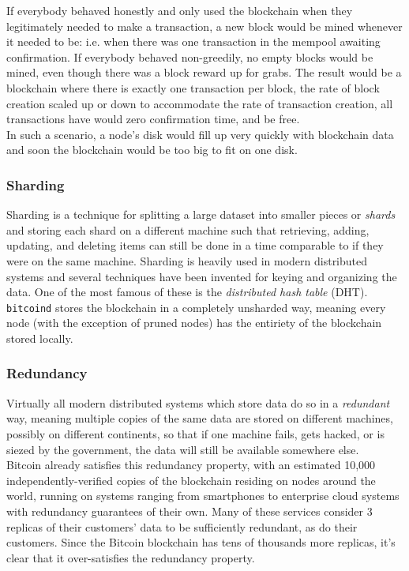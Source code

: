 \documentclass{report}
\begin{document}
				If everybody behaved honestly and only used the blockchain when they legitimately needed to make a transaction, a new block would be mined whenever it needed to be: i.e. when there was one transaction in the mempool awaiting confirmation. If everybody behaved non-greedily, no empty blocks would be mined, even though there was a block reward up for grabs. The result would be a blockchain where there is exactly one transaction per block, the rate of block creation scaled up or down to accommodate the rate of transaction creation, all transactions have would zero confirmation time, and be free. \\

				In such a scenario, a node's disk would fill up very quickly with blockchain data and soon the blockchain would be too big to fit on one disk.
			\subsubsection{Sharding}
				Sharding is a technique for splitting a large dataset into smaller pieces or \textit{shards} and storing each shard on a different machine such that retrieving, adding, updating, and deleting items can still be done in a time comparable to if they were on the same machine. Sharding is heavily used in modern distributed systems and several techniques have been invented for keying and organizing the data. One of the most famous of these is the \textit{distributed hash table} (DHT).  \texttt{bitcoind} stores the blockchain in a completely unsharded way, meaning every node (with the exception of pruned nodes) has the entiriety of the blockchain stored locally.
			\subsubsection{Redundancy}
				Virtually all modern distributed systems which store data do so in a \textit{redundant} way, meaning multiple copies of the same data are stored on different machines, possibly on different continents, so that if one machine fails, gets hacked, or is siezed by the government, the data will still be available somewhere else. \\

Bitcoin already satisfies this redundancy property, with an estimated 10,000 independently-verified copies of the blockchain residing on nodes around the world, running on systems ranging from smartphones to enterprise cloud systems  with redundancy guarantees of their own. Many of these services consider 3 replicas of their customers' data to be sufficiently redundant, as do their customers. Since the Bitcoin blockchain has tens of thousands more replicas, it's clear that it over-satisfies the redundancy property.
\end{document}

